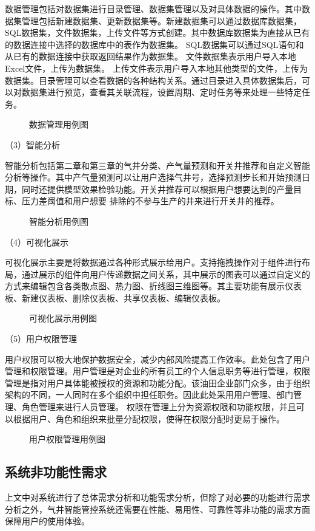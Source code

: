 数据管理包括对数据集进行目录管理、数据集管理以及对具体数据的操作。其中数据集管理包括新建数据集、更新数据集等。新建数据集可以通过数据库数据集，SQL数据集，文件数据集，上传文件等方式创建。其中数据库数据集为直接从已有的数据连接中选择的数据库中的表作为数据集。
SQL数据集可以通过SQL语句和从已有的数据连接中获取返回结果作为数据集。
文件数据集表示用户导入本地Excel文件，上传为数据集。
上传文件表示用户导入本地其他类型的文件，上传为数据集。目录管理可以查看数据的各种结构关系。通过目录进入具体数据集后，可以对数据集进行预览，查看其关联流程，设置周期、定时任务等来处理一些特定任务。
\begin{figure}[H]
    \centering
    \caption{数据管理用例图}
\end{figure}

（3）智能分析

智能分析包括第二章和第三章的气井分类、产气量预测和开关井推荐和自定义智能分析等操作。其中产气量预测可以让用户选择气井号，选择预测步长和开始预测日期，同时还提供模型效果检验功能。开关井推荐可以根据用户想要达到的产量目标、压力差阈值和用户想要
排除的不参与生产的井来进行开关井的推荐。
\begin{figure}[H]
    \centering
    \caption{智能分析用例图}
\end{figure}

（4）可视化展示

可视化展示主要是将数据通过各种形式展示给用户。支持拖拽操作对于组件进行布局，通过展示的组件向用户传递数据之间关系，其中展示的图表可以通过自定义的方式来编辑包含各类散点图、热力图、折线图三维图等。其主要功能有展示仪表板、新建仪表板、删除仪表板、共享仪表板、编辑仪表板。
\begin{figure}[H]
    \centering
    \caption{可视化展示用例图}
\end{figure}

（5）用户权限管理

用户权限可以极大地保护数据安全，减少内部风险提高工作效率。此处包含了用户管理和权限管理。用户管理是对企业的所有员工的个人信息职务等进行管理，权限管理是指对用户具体能被授权的资源和功能分配。该油田企业部门众多，由于组织架构的不同，一人同时在多个组织中担任职务。因此此处采用用户管理、部门管理、角色管理来进行人员管理。
权限在管理上分为资源权限和功能权限，并且可以根据用户、角色和组织来批量分配权限，使得在权限分配时更易于操作。
\begin{figure}[H]
    \centering
    \caption{用户权限管理用例图}
\end{figure}
\subsection{系统非功能性需求}
上文中对系统进行了总体需求分析和功能需求分析，但除了对必要的功能进行需求分析之外，气井智能管控系统还需要在性能、易用性、可靠性等非功能的需求方面保障用户的使用体验。

